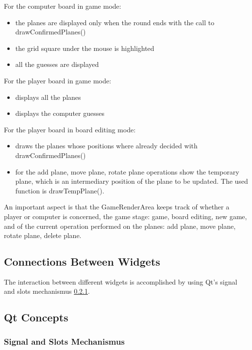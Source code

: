 For the computer board in game mode:
\begin{itemize}
	\item the planes are displayed only when the round ends with the call to drawConfirmedPlanes()
	\item the grid square under the mouse is highlighted 
	\item all the guesses are displayed
\end{itemize}


For the player board in game mode:
\begin{itemize}
	\item displays all the planes
	\item displays the computer guesses
\end{itemize}


For the player board in board editing mode:
\begin{itemize}
	\item draws the planes whose positions where already decided with drawConfirmedPlanes()
	\item for the add plane, move plane, rotate plane operations show the temporary plane, which is an intermediary position of the plane to be updated. The used function is drawTempPlane().
\end{itemize}

An important aspect is that the GameRenderArea keeps track of whether a player or computer is concerned, the game stage: game, board editing, new game, and of the current operation performed on the planes: add plane, move plane, rotate plane, delete plane.

\subsection{Connections Between Widgets}

The interaction between different widgets is accomplished by using Qt's signal and slots mechanismus \ref{Qt_Signals_Slots}. 


\subsection {Qt Concepts}

\subsubsection{Signal and Slots Mechanismus} \label {Qt_Signals_Slots}

